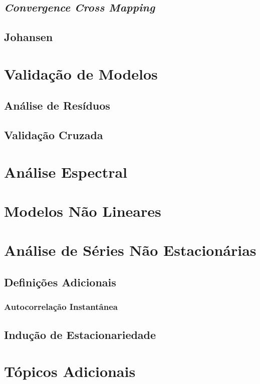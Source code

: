 \section{\emph{Convergence Cross Mapping}}

\section{Johansen}

\chapter{Validação de Modelos}

\section{Análise de Resíduos}
\label{sec:residual_analysis}

\section{Validação Cruzada}

\chapter{Análise Espectral}

\chapter{Modelos Não Lineares}
\label{chap:non_stationary}

\chapter{Análise de Séries Não Estacionárias}

\section{Definições Adicionais}
\subsection{Autocorrelação Instantânea}
\label{ssec:inst_autocorr}

\section{Indução de Estacionariedade}

\chapter{Tópicos Adicionais}
